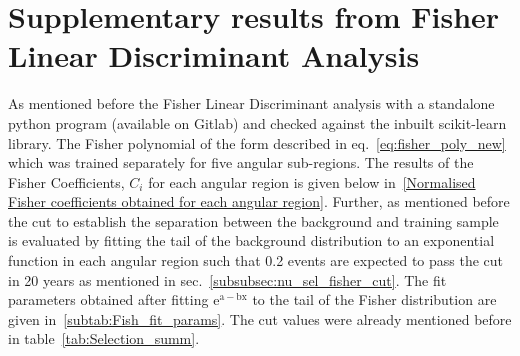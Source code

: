 \chapter{Supplementary results from Fisher Linear Discriminant Analysis}
\label{sec:app_4}

As mentioned before the Fisher Linear Discriminant analysis with a standalone python program (available on Gitlab) and checked against the inbuilt scikit-learn library. The Fisher polynomial of the form described in eq.~\ref{eq:fisher_poly_new} which was trained separately for five angular sub-regions. The results of the Fisher Coefficients, $C_i$ for each angular region is given below in~\ref{Normalised Fisher coefficients obtained for each angular region}. 
Further, as mentioned before the cut to establish the separation between the background and training sample is evaluated by fitting the tail of the background distribution to an exponential function in each angular region such that 0.2 events are expected to pass the cut in 20 years as mentioned in sec.~\ref{subsubsec:nu_sel_fisher_cut}. The fit parameters obtained after fitting $\mathrm{e^{a-bx}}$ to the tail of the Fisher distribution are given in~\ref{subtab:Fish_fit_params}. The cut values were already mentioned before in table~\ref{tab:Selection_summ}.


